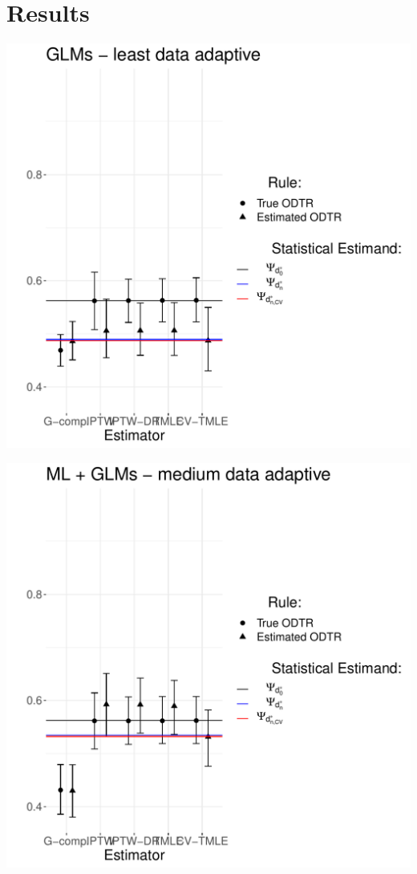 \documentclass[11pt]{article}\usepackage[]{graphicx}\usepackage[]{color}
\makeatletter
\def\maxwidth{ %
  \ifdim\Gin@nat@width>\linewidth
    \linewidth
  \else
    \Gin@nat@width
  \fi
}
\newenvironment{knitrout}{}{} %
\makeatother
\begin{document}
\section{Results}
\begin{knitrout}
\color{fgcolor}
\includegraphics[width=\maxwidth]{figure/unnamed-chunk-6-1} 

\includegraphics[width=\maxwidth]{figure/unnamed-chunk-6-2} 


\end{knitrout}
\end{document}

